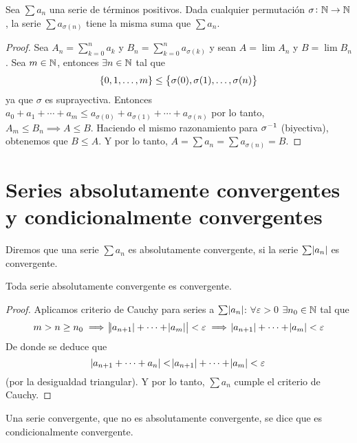 \begin{prop}
	Sea $\sum a_n$ una serie de términos positivos. Dada cualquier permutación $\sigma
	\colon \mathbb{N} \to \mathbb{N}$, la serie $\sum a_{\sigma(n)}$ tiene la misma suma que $\sum a_n$.
\end{prop}

\begin{proof}
	Sea $A_n = \sum\limits_{k=0}^n a_k$ y $B_n = \sum\limits_{k=0}^n a_{\sigma(k)}$ y sean
	$A = \lim A_n$ y $B = \lim B_n$. Sea
	$m \in \mathbb{N}$, entonces $\exists n \in \mathbb{N}$ tal que
	\[
		\left\{0,1, \dots, m\right\} \leq \left\{\sigma(0), \sigma(1), \dots, \sigma(n)\right\}
	\]
	ya que $\sigma$ es suprayectiva. Entonces $a_0 + a_1 + \cdots + a_m \leq a_{\sigma(0)} +
	a_{\sigma(1)} + \cdots + a_{\sigma(n)}$ por lo tanto, $A_m \leq B_n \implies A \leq B$.
	Haciendo el mismo razonamiento para $\sigma^{-1}$ (biyectiva), obtenemos que $B \leq A$.
	Y por lo tanto, $A = \sum a_n = \sum a_{\sigma(n)} = B$.
\end{proof}

\section{Series absolutamente convergentes y condicionalmente convergentes}

\begin{defi}
  Diremos que una serie $\sum a_n$ es absolutamente convergente, si la serie $\sum \abs{a_n}$ es convergente.
\end{defi}

\begin{prop}
  Toda serie absolutamente convergente es convergente.
\end{prop}

\begin{proof}
  Aplicamos criterio de Cauchy para series a $\sum \abs{a_n}$: $\forall \varepsilon > 0$ $\exists n_0 \in \mathbb{N}$
  tal que
  \[
    m > n \geq n_0 \implies \abs{\abs{a_{n+1}} + \cdots + \abs{a_m}} < \varepsilon \implies
    \abs{a_{n+1}} + \cdots + \abs{a_m} < \varepsilon
  \]
  De donde se deduce que
  \[
    \abs{a_{n+1} + \cdots + a_n} < \abs{a_{n+1}} + \cdots + \abs{a_m} < \varepsilon
  \]
  (por la desigualdad triangular). Y por lo tanto, $\sum a_n$ cumple el criterio de Cauchy.

\end{proof}

\begin{defi}
  Una serie convergente, que no es absolutamente convergente, se dice que es condicionalmente convergente.
\end{defi}

